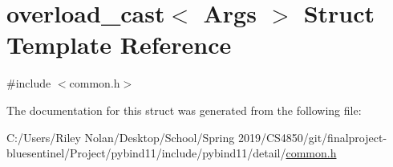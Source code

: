 \hypertarget{structoverload__cast}{}\section{overload\+\_\+cast$<$ Args $>$ Struct Template Reference}
\label{structoverload__cast}


{\ttfamily \#include $<$common.\+h$>$}



The documentation for this struct was generated from the following file\+:\begin{DoxyCompactItemize}
\item 
C\+:/\+Users/\+Riley Nolan/\+Desktop/\+School/\+Spring 2019/\+C\+S4850/git/finalproject-\/bluesentinel/\+Project/pybind11/include/pybind11/detail/\mbox{\hyperlink{detail_2common_8h}{common.\+h}}\end{DoxyCompactItemize}
